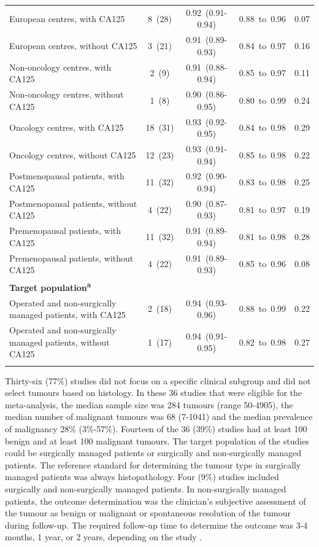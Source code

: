 \begin{table}
\begin{tabularx}{\textheight}{>{\raggedright\arraybackslash}X c c c c}
European centres, with CA125 & 8~(28) & 0.92~(0.91-0.94) & 0.88~to~0.96 & 0.07 \\
European centres, without CA125 & 3~(21) & 0.91~(0.89-0.93) & 0.84~to~0.97 & 0.16 \\
Non-oncology centres, with CA125 & 2~(9) & 0.91~(0.88-0.94) & 0.85~to~0.97 & 0.11 \\
Non-oncology centres, without CA125 & 1~(8) & 0.90~(0.86-0.95) & 0.80~to~0.99 & 0.24 \\
Oncology centres, with CA125 & 18~(31) & 0.93~(0.92-0.95) & 0.84~to~0.98 & 0.29 \\
Oncology centres, without CA125 & 12~(23) & 0.93~(0.91-0.94) & 0.85~to~0.98 & 0.22 \\
Postmenopausal patients, with CA125 & 11~(32) & 0.92~(0.90-0.94) & 0.83~to~0.98 & 0.25 \\
Postmenopausal patients, without CA125 & 4~(22) & 0.90~(0.87-0.93) & 0.81~to~0.97 & 0.19 \\
Premenopausal patients, with CA125 & 11~(32) & 0.91~(0.89-0.94) & 0.81~to~0.98 & 0.28 \\
Premenopausal patients, without CA125 & 4~(22) & 0.91~(0.89-0.93) & 0.85~to~0.96 & 0.08 \\
\addlinespace
\textbf{Target population\textsuperscript{a}} & & & & \\
Operated and non-surgically managed patients, with CA125 & 2~(18) & 0.94~(0.93-0.96) & 0.88~to~0.99 & 0.22 \\
Operated and non-surgically managed patients, without CA125 & 1~(17) & 0.94~(0.91-0.95) & 0.82~to~0.98 & 0.27 \\
\bottomrule
\addlinespace[0.5em]
\multicolumn{5}{l}{\textsuperscript{a}Follow up time was 10-14 months (1 year) or 2 years}
\end{tabularx}
\end{table}



Thirty-six (77\%) studies did not focus on a specific clinical subgroup and did
not select tumours based on histology. In these 36 studies that were eligible
for the meta-analysis, the median sample size was 284 tumours (range 50-4905),
the median number of malignant tumours was 68 (7-1041) and the median prevalence
of malignancy 28\% (3\%-57\%). Fourteen of the 36 (39\%) studies had at least
100 benign and at least 100 malignant tumours. The target population of the
studies could be surgically managed patients or surgically and non-surgically
managed patients. The reference standard for determining the tumour type in
surgically managed patients was always histopathology. Four (9\%) studies
included surgically and non-surgically managed patients. In non-surgically
managed patients, the outcome determination was the clinician’s subjective
assessment of the tumour as benign or malignant or spontaneous resolution of the
tumour during follow-up. The required follow-up time to determine the outcome
was 3-4 months, 1 year, or 2 years, depending on the study
 \cite{vancalsterValidationModelsDiagnose2020,hackExternalValidationORADS2022,
  jeongValidationIOTAADNEXModel2020,quarantaSurgeryBenignOvarian2020}.

